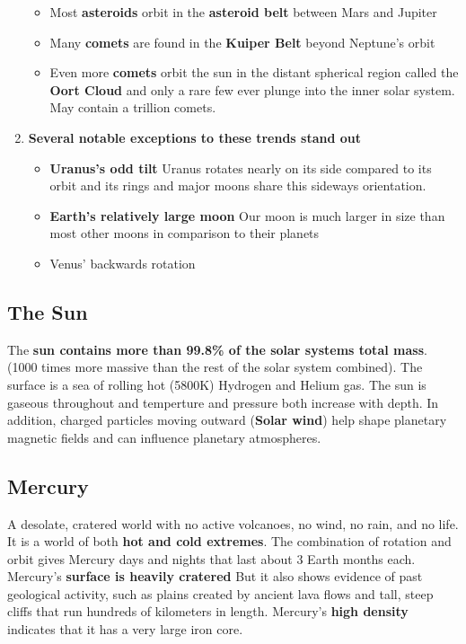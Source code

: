 \documentclass[12pt]{article}
\begin{document}
\begin{enumerate}
\begin{itemize}
\item Most {\bf asteroids} orbit in the {\bf asteroid belt} between Mars and Jupiter
\item Many {\bf comets} are found in the {\bf Kuiper Belt} beyond Neptune's orbit
\item Even more {\bf comets} orbit the sun in the distant spherical region called the {\bf Oort Cloud} and only a rare few ever plunge into the inner solar system. May contain a trillion comets.
\end{itemize}
\item {\bf Several notable exceptions to these trends stand out}
\begin{itemize}
\item {\bf Uranus's odd tilt} Uranus rotates nearly on its side compared to its orbit and its rings and major moons share this sideways orientation.
\item {\bf Earth's relatively large moon} Our moon is much larger in size than most other moons in comparison to their planets
\item {Venus' backwards rotation}
\end{itemize}
\end{enumerate}

\subsection{The Sun}
The {\bf sun contains more than 99.8\% of the solar systems total mass}. (1000 times more massive than the rest of the solar system combined). The surface is a sea of rolling hot (5800K) Hydrogen and Helium gas. The sun is gaseous throughout and temperture and pressure both increase with depth. In addition, charged particles moving outward ({\bf Solar wind}) help shape planetary magnetic fields and can influence planetary atmospheres.

\subsection{Mercury}
A desolate, cratered world with no active volcanoes, no wind, no rain, and no life. It is a world of both {\bf hot and cold extremes}. The combination of rotation and orbit gives Mercury days and nights that last about 3 Earth months each. Mercury’s {\bf surface is heavily cratered} But it also shows evidence of past geological activity, such as plains created
by ancient lava flows and tall, steep cliffs that run hundreds of kilometers in length. Mercury’s {\bf high density} indicates that it has a very large iron core.
\end{document}
